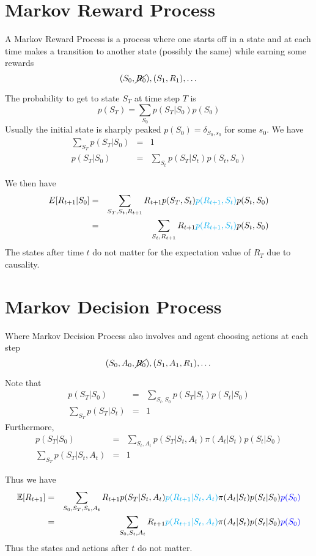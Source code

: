 \documentclass[11pt,a4paper]{article}
\newcommand\be{\begin{equation}}
\newcommand\bea{\begin{eqnarray}}
\newcommand\ee{\end{equation}}
\newcommand\eea{\end{eqnarray}}
\newcommand{\nn}{\nonumber \\}
\begin{document}
\section{Markov Reward Process}

A Markov Reward Process is a process where one starts off in a state and at each time makes a transition to another state (possibly the same) while earning some rewards
\be
(S_0,\cancel{R_0}),(S_1,R_1), \dots
\ee

The probability to get to state $S_T$ at time step $T$ is
\be
p(S_T) = \sum_{S_0} p(S_T|S_0)p(S_0)
\ee
Usually the initial state is sharply peaked $p(S_0) = \delta_{S_0,s_0}$ for some $s_0$. We have
\bea
\sum_{S_T} p(S_T|S_0) &=& 1 \\
p(S_T|S_0) &=& \sum_{S_t} p(S_T|S_t)p(S_t,S_0)
\eea

We then have
\bea
E[R_{t+1}|S_0] &=& \sum_{S_T,S_{t},R_{t+1}} R_{t+1} p(S_T,S_{t}) {\color{cyan} p(R_{t+1},S_{t})} p(S_{t},S_0) \nn
&=& \sum_{S_{t},R_{t+1}} R_{t+1} {\color{cyan} p(R_{t+1},S_{t})} p(S_{t},S_0)
\eea
The states after time $t$ do not matter for the expectation value of $R_T$ due to causality.



\section{Markov Decision Process}

Where Markov Decision Process also involves and agent choosing actions at each step
\be
(S_0,A_0,\cancel{R_0}),(S_1,A_1,R_1), \dots
\ee

Note that
\bea
p(S_T|S_0) &=& \sum_{S_t,S_0} p(S_T|S_t) p(S_t|S_0) \\
\sum_{S_T} p(S_T|S_t) &=& 1
\eea
Furthermore,
\bea
p(S_T|S_0) &=& \sum_{S_t,A_t} p(S_T|S_t,A_t) \pi(A_t|S_t) p (S_t|S_0) \\
\sum_{S_T} p(S_T|S_t,A_t) &=& 1
\eea

Thus we have
\bea
\mathbb E[R_{t+1}] &=&  \sum_{S_0,S_T,S_t,A_t} R_{t+1} p(S_T|S_t,A_t) {\color{cyan} p(R_{t+1}|S_t,A_t)} \pi(A_t|S_t) p (S_t|S_0) {\color{blue} p(S_0)} \nn
&=& \sum_{S_0,S_t,A_t} R_{t+1} {\color{cyan} p(R_{t+1}|S_t,A_t)} \pi(A_t|S_t) p (S_t|S_0) {\color{blue} p(S_0)}
\eea
Thus the states and actions after $t$ do not matter.
\end{document}
